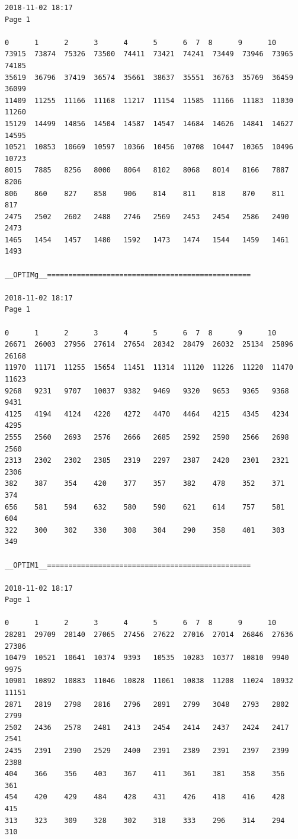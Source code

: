 \begin{lstlisting}[frame=single]
2018-11-02 18:17                                                          Page 1

0      1      2	     3	    4	   5	  6	 7	8      9      10
73915  73874  75326  73500  74411  73421  74241	 73449	73946  73965  74185
35619  36796  37419  36574  35661  38637  35551	 36763	35769  36459  36099
11409  11255  11166  11168  11217  11154  11585	 11166	11183  11030  11260
15129  14499  14856  14504  14587  14547  14684	 14626	14841  14627  14595
10521  10853  10669  10597  10366  10456  10708	 10447	10365  10496  10723
8015   7885   8256   8000   8064   8102	  8068	 8014	8166   7887   8206
806    860    827    858    906	   814	  811	 818	870    811    817
2475   2502   2602   2488   2746   2569	  2453	 2454	2586   2490   2473
1465   1454   1457   1480   1592   1473	  1474	 1544	1459   1461   1493

__OPTIMg__================================================

2018-11-02 18:17                                                          Page 1

0      1      2	     3	    4	   5	  6	 7	8      9      10
26671  26003  27956  27614  27654  28342  28479	 26032	25134  25896  26168
11970  11171  11255  15654  11451  11314  11120	 11226	11220  11470  11623
9268   9231   9707   10037  9382   9469	  9320	 9653	9365   9368   9431
4125   4194   4124   4220   4272   4470	  4464	 4215	4345   4234   4295
2555   2560   2693   2576   2666   2685	  2592	 2590	2566   2698   2560
2313   2302   2302   2385   2319   2297	  2387	 2420	2301   2321   2306
382    387    354    420    377	   357	  382	 478	352    371    374
656    581    594    632    580	   590	  621	 614	757    581    604
322    300    302    330    308	   304	  290	 358	401    303    349

__OPTIM1__================================================

2018-11-02 18:17                                                          Page 1

0      1      2	     3	    4	   5	  6	 7	8      9      10
28281  29709  28140  27065  27456  27622  27016	 27014	26846  27636  27386
10479  10521  10641  10374  9393   10535  10283	 10377	10810  9940   9975
10901  10892  10883  11046  10828  11061  10838	 11208	11024  10932  11151
2871   2819   2798   2816   2796   2891	  2799	 3048	2793   2802   2799
2502   2436   2578   2481   2413   2454	  2414	 2437	2424   2417   2541
2435   2391   2390   2529   2400   2391	  2389	 2391	2397   2399   2388
404    366    356    403    367	   411	  361	 381	358    356    361
454    420    429    484    428	   431	  426	 418	416    428    415
313    323    309    328    302	   318	  333	 296	314    294    310


\end{lstlisting}
